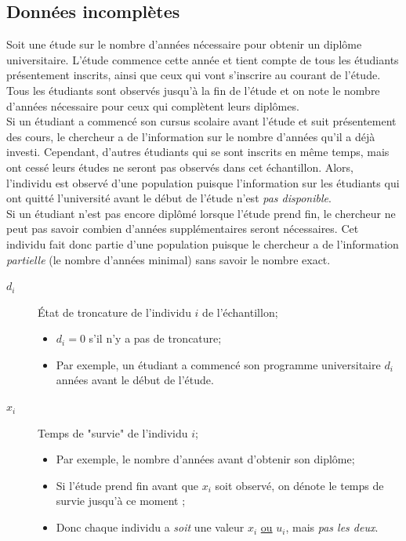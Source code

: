 \documentclass[10pt, french]{article}
\begin{document}
\begin{multicols*}{2}
\columnbreak
\subsection{Données incomplètes}

\begin{rappel_enhanced}[Exemple]
Soit une étude sur le nombre d'années nécessaire pour obtenir un diplôme universitaire. L'étude commence cette année et tient compte de tous les étudiants présentement inscrits, ainsi que ceux qui vont s'inscrire au courant de l'étude. Tous les étudiants sont observés jusqu'à la fin de l'étude et on note le nombre d'années nécessaire pour ceux qui complètent leurs diplômes. \\

Si un étudiant a commencé son cursus scolaire avant l'étude et suit présentement des cours, le chercheur a de l'information sur le nombre d'années qu'il a déjà investi. Cependant, d'autres étudiants qui se sont inscrits en même temps, mais ont cessé leurs études ne seront pas observés dans cet échantillon. Alors, l'individu est observé d'une population  puisque l'information sur les étudiants qui ont quitté l'université avant le début de l'étude n'est \textit{pas disponible}.\\

Si un étudiant n'est pas encore diplômé lorsque l'étude prend fin, le chercheur ne peut pas savoir combien d'années supplémentaires seront nécessaires. Cet individu fait donc partie d'une population  puisque le chercheur a de l'information \textit{partielle} (le nombre d'années minimal) sans savoir le nombre exact.
\end{rappel_enhanced}

\begin{distributions}[Notation]
\begin{description}
	\item[$d_{i}$]	État de troncature de l'individu $i$ de l'échantillon;
		\begin{itemize}[leftmargin = *]
		\item	$d_{i}	=	0$ s'il n'y a pas de troncature;
		\item	Par exemple, un étudiant a commencé son programme universitaire $d_{i}$ années avant le début de l'étude.
		\end{itemize}
	\item[$x_{i}$]	Temps de "survie" de l'individu $i$;
		\begin{itemize}[leftmargin = *]
		\item	Par exemple, le nombre d'années avant d'obtenir son diplôme;
		\item	Si l'étude prend fin avant que $x_{i}$ soit observé, on dénote le temps de survie jusqu'à ce moment ;
		\item	Donc chaque individu a \textit{soit} une valeur $x_{i}$ \underline{ou} $u_{i}$, mais \textit{pas les deux}.
		\end{itemize}
\end{description}
\end{distributions}


\end{multicols*}
\end{document}

